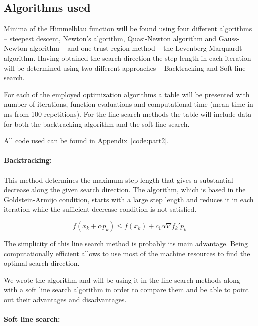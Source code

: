 \subsection{Algorithms used}

Minima of the Himmelblau function will be found using four different algorithms -- steepest descent, Newton's algorithm, Quasi-Newton algorithm and Gauss-Newton algorithm -- and one trust region method -- the Levenberg-Marquardt algorithm. Having obtained the search direction the step length in each iteration will be determined using two different approaches -- Backtracking and Soft line search.

For each of the employed optimization algorithms a table will be presented with number of iterations, function evaluations and computational time (mean time in ms from 100 repetitions). For the line search methods the table will include data for both the backtracking algorithm and the soft line search. 

All code used can be found in Appendix~\ref{code:part2}.

\paragraph{Backtracking:}

This method determines the maximum step length that gives a substantial decrease along the given search direction. The algorithm, which is based in the Goldstein-Armijo condition, starts with a large step length and reduces it in each iteration while the sufficient decrease condition is not satisfied.

\begin{equation}
f(x_k + \alpha p_k) \leq f(x_k) + c_1 \alpha \nabla f_k' p_k
\label{eq:sufficientDecrease}
\end{equation}

The simplicity of this line search method is probably its main advantage. Being computationally efficient allows to use most of the machine resources to find the optimal search direction.

We wrote the algorithm and will be using it in the line search methods along with a soft line search algorithm in order to compare them and be able to point out their advantages and disadvantages.

\paragraph{Soft line search:}

